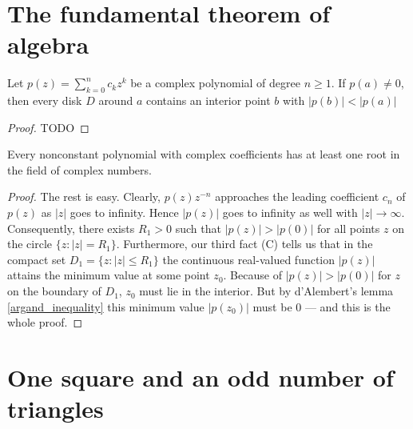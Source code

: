 \chapter{The fundamental theorem of algebra}

\begin{lemma}
  \label{argand_inequality}
  Let $p(z) = \sum_{k=0}^n c_k z^k$ be a complex polynomial of degree $n\ge 1$.
  If $p(a)\ne0$, then every disk $D$ around $a$ contains an interior point $b$ with $|p(b)| < |p(a)|$
\end{lemma}
\begin{proof}
  TODO
\end{proof}

\begin{theorem}
  \label{fundamental_theorem_of_algbra}
  Every nonconstant polynomial with complex coefficients has at least one root in the field of complex numbers.
\end{theorem}
\begin{proof}
  The rest is easy. Clearly, $p(z)z^{-n}$ approaches the leading coefficient $c_n$
  of $p(z)$ as $|z|$ goes to infinity. Hence $|p(z)|$ goes to infinity as well with
  $|z| \to \infty$. Consequently, there exists $R_1 > 0$ such that $|p(z)| > |p(0)|$ for
  all points $z$ on the circle $\{ z : |z| = R_1 \}$. Furthermore, our third fact (C)
  tells us that in the compact set $D_1 = \{ z : |z| \leq R_1 \}$ the continuous real-valued
  function $|p(z)|$ attains the minimum value at some point $z_0$. Because
  of $|p(z)| > |p(0)|$ for $z$ on the boundary of $D_1$, $z_0$ must lie in the interior.
  But by d'Alembert's lemma \ref{argand_inequality} this minimum value $|p(z_0)|$ must
  be $0$ — and this is the whole proof.
\end{proof}


\chapter{One square and an odd number of triangles}


\begin{definition}
  \label{valuation}
\end{definition}

